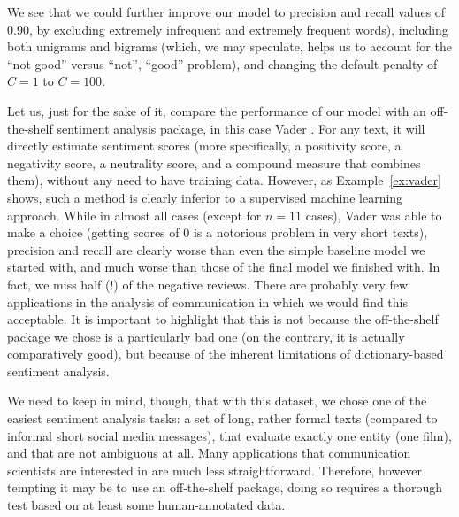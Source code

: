 
We see that we could further improve our model to precision and recall
values of 0.90, by excluding extremely infrequent and extremely
frequent words), including both unigrams and bigrams (which, we may
speculate, helps us to account for the ``not good'' versus ``not'',
``good'' problem), and changing the default penalty of $C=1$ to $C=100$.

Let us, just for the sake of it, compare the performance of our model
with an off-the-shelf sentiment analysis package, in this case Vader
\citep{Hutto2014}. For any text, it will directly estimate sentiment
scores (more specifically, a positivity score, a negativity score, a
neutrality score, and a compound measure that combines them), without
any need to have training data. However, as Example~\ref{ex:vader} shows, such
a method is clearly inferior to a supervised machine learning
approach. While in almost all cases (except for $n=11$ cases), Vader was able to
make a choice (getting scores of 0 is a notorious problem in very
short texts), precision and recall are clearly worse than even the
simple baseline model we started with, and much worse than those of
the final model we finished with. In fact, we miss half (!) of the
negative reviews. There are probably very few applications in the
analysis of communication in which we would find this acceptable.
It is important to highlight that this is not because the off-the-shelf
package we chose is a particularly bad one (on the contrary, it is
actually comparatively good), but because of the inherent limitations
of dictionary-based sentiment analysis.


We need to keep in mind, though, that with this dataset, we chose one
of the easiest sentiment analysis tasks: a set of long, rather formal
texts (compared to informal short social media messages), that
evaluate exactly one entity (one film), and that are not ambiguous at
all. Many applications that communication scientists are interested
in are much less straightforward. Therefore, however tempting it may be
to use an off-the-shelf package, doing so requires a thorough test
based on at least some human-annotated data.




